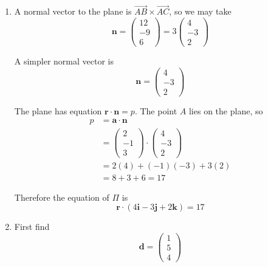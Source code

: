 \documentclass[leqno]{article}
\begin{document}
\begin{enumerate}[
  label=\textbf{\arabic*.},
  leftmargin=*,
  topsep=0pt,
  partopsep=0pt,
  parsep=0pt
]
\begin{djsSolution}
\begin{enumerate}[label=\textbf{(\alph*)}]
Hence
\begin{align*}
\overrightarrow{AB}\times\overrightarrow{AC}
&=
\begin{vmatrix}
\mathbf{i} & \mathbf{j} & \mathbf{k} \\
3 & 2 & -3 \\
3 & 4 & 0
\end{vmatrix} \\
&=\mathbf{i}(2\times 0-(-3)\times 4)-\mathbf{j}(3\times 0-(-3)\times 3)+\mathbf{k}(3\times 4-2\times 3) \\
&=12\mathbf{i}-9\mathbf{j}+6\mathbf{k}
\end{align*}

  \item A normal vector to the plane is \(\overrightarrow{AB}\times\overrightarrow{AC}\), so we may take
\[
\mathbf{n}=\begin{pmatrix}12\\-9\\6\end{pmatrix}=3\begin{pmatrix}4\\-3\\2\end{pmatrix}
\]

A simpler normal vector is
\[
\mathbf{n}=\begin{pmatrix}4\\-3\\2\end{pmatrix}
\]

The plane has equation \(\mathbf{r}\cdot\mathbf{n}=p\). The point \(A\) lies on the plane, so
\begin{align*}
p&=\mathbf{a}\cdot\mathbf{n} \\
&=\begin{pmatrix}2\\-1\\3\end{pmatrix}\cdot\begin{pmatrix}4\\-3\\2\end{pmatrix} \\
&=2(4)+(-1)(-3)+3(2) \\
&=8+3+6=17
\end{align*}

Therefore the equation of \(\Pi\) is
\[
\mathbf{r}\cdot(4\mathbf{i}-3\mathbf{j}+2\mathbf{k})=17
\]

  \item First find
\[
\mathbf{d}=\begin{pmatrix}1\\5\\4\end{pmatrix}
\]


\end{enumerate}
\end{djsSolution}
\end{enumerate}
\end{document}
